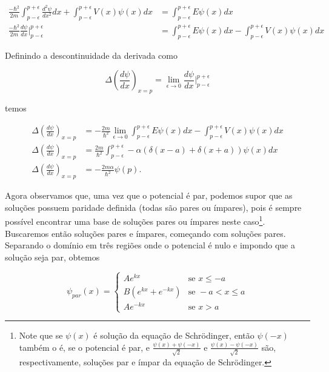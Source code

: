\documentclass[a4paper, 12pt, notitlepage]{article}
\begin{document}
\begin{enumerate}
\begin{enumerate}
    \begin{align*}
    \frac{-\hbar^2}{2m} \int_{p - \epsilon}^{p + \epsilon} \frac{d^2 \psi}{dx^2} dx + \int_{p - \epsilon}^{p + \epsilon} V(x)\psi(x)dx &= \int_{p - \epsilon}^{p + \epsilon} E \psi(x) dx \\
    \frac{-\hbar^2}{2m} \frac{d\psi}{dx}\Big|_{p - \epsilon}^{p + \epsilon} &= \int_{p - \epsilon}^{p + \epsilon} E \psi(x) dx - \int_{p - \epsilon}^{p + \epsilon} V(x)\psi(x)dx
    \end{align*}

    Definindo a descontinuidade da derivada como 

    \begin{equation*}
    \Delta\left(\frac{d\psi}{dx}\right)_{x = p} = \lim_{\epsilon \to 0} \frac{d\psi}{dx}\Big|_{p - \epsilon}^{p + \epsilon}
    \end{equation*} 
    
    \noindent temos

    \begin{align*}
    \Delta \left( \frac{d\psi}{dx} \right)_{x = p} &= -\frac{2m}{\hbar^2} \lim_{\epsilon \to 0} \int_{p - \epsilon}^{p + \epsilon} E \psi(x) dx - \int_{p - \epsilon}^{p + \epsilon} V(x)\psi(x)dx \\
    \Delta \left( \frac{d\psi}{dx} \right)_{x = p} &= \frac{2m}{\hbar^2} \int_{p - \epsilon}^{p + \epsilon} -\alpha\left(\delta(x - a) + \delta(x + a)\right) \psi(x) dx \\
    \Delta \left( \frac{d\psi}{dx} \right)_{x = p} &= -\frac{2m\alpha}{\hbar^2}\psi(p).
    \end{align*}

    Agora observamos que, uma vez que o potencial é par, podemos supor que as soluções possuem paridade definida (todas são pares ou ímpares), pois é sempre possível encontrar uma base de soluções pares ou ímpares neste caso\footnote{Note que se $\psi(x)$ é solução da equação de Schrödinger, então $\psi(-x)$ também o é, se o potencial é par, e $\frac{\psi(x) + \psi(-x)}{\sqrt{2}}$ e $\frac{\psi(x) - \psi(-x)}{\sqrt{2}}$ são, respectivamente, soluções par e ímpar da equação de Schrödinger.}. Buscaremos então soluções pares e ímpares, começando com soluções pares. Separando o domínio em três regiões onde o potencial é nulo e impondo que a solução seja par, obtemos

    \begin{equation*}
    \psi_{par}(x) = 
    \begin{cases}
      Ae^{kx} &\text{se }x \leq -a\\
      B\left(e^{kx} + e^{-kx}\right) &\text{se }-a < x \leq a\\
      Ae^{-kx} &\text{se }x > a
    \end{cases}
    \end{equation*}
    

\end{enumerate}
\end{enumerate}
\end{document}
